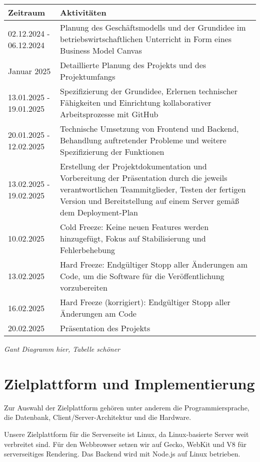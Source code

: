 \documentclass[a4paper,12pt]{article}
\begin{document}
\newpage
\begin{longtable}{|p{4cm}|p{11cm}|}
	\hline
	\textbf{Zeitraum} & \textbf{Aktivitäten} \\
	\hline
	02.12.2024 - 06.12.2024 & Planung des Geschäftsmodells und der Grundidee im betriebswirtschaftlichen Unterricht in Form eines Business Model Canvas \\
	\hline
	Januar 2025 & Detaillierte Planung des Projekts und des Projektumfangs \\
	\hline
	13.01.2025 - 19.01.2025 & Spezifizierung der Grundidee, Erlernen technischer Fähigkeiten und Einrichtung kollaborativer Arbeitsprozesse mit GitHub \\
	\hline
	20.01.2025 - 12.02.2025 & Technische Umsetzung von Frontend und Backend, Behandlung auftretender Probleme und weitere Spezifizierung der Funktionen \\
	\hline
	13.02.2025 - 19.02.2025 & Erstellung der Projektdokumentation und Vorbereitung der Präsentation durch die jeweils verantwortlichen Teammitglieder, Testen der fertigen Version und Bereitstellung auf einem Server gemäß dem Deployment-Plan \\
	\hline
	10.02.2025 & Cold Freeze: Keine neuen Features werden hinzugefügt, Fokus auf Stabilisierung und Fehlerbehebung \\
	\hline
	13.02.2025 & Hard Freeze: Endgültiger Stopp aller Änderungen am Code, um die Software für die Veröffentlichung vorzubereiten \\
	\hline
	16.02.2025 & Hard Freeze (korrigiert): Endgültiger Stopp aller Änderungen am Code \\
	\hline
	20.02.2025 & Präsentation des Projekts \\
	\hline
\end{longtable}

\textit{
Gant Diagramm hier, Tabelle schöner
}

\newpage \section{Zielplattform und Implementierung}
Zur Auswahl der Zielplattform gehören unter anderem die Programmiersprache, die Datenbank, Client/Server-Architektur und die Hardware. 

Unsere Zielplattform für die Serverseite ist Linux, da Linux-basierte Server weit verbreitet sind. Für den Webbrowser setzen wir auf Gecko, WebKit und V8 für serverseitiges Rendering. Das Backend wird mit Node.js auf Linux betrieben.
\end{document}
